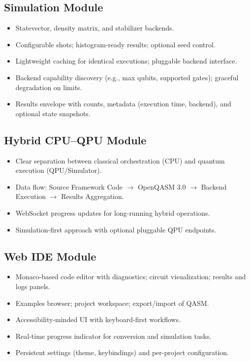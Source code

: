 \subsection{Simulation Module}
\begin{itemize}
    \item Statevector, density matrix, and stabilizer backends.
    \item Configurable shots; histogram-ready results; optional seed control.
    \item Lightweight caching for identical executions; pluggable backend interface.
    \item Backend capability discovery (e.g., max qubits, supported gates); graceful degradation on limits.
    \item Results envelope with counts, metadata (execution time, backend), and optional state snapshots.
\end{itemize}

\subsection{Hybrid CPU–QPU Module}
\begin{itemize}
    \item Clear separation between classical orchestration (CPU) and quantum execution (QPU/Simulator).
    \item Data flow: Source Framework Code $\rightarrow$ OpenQASM 3.0 $\rightarrow$ Backend Execution $\rightarrow$ Results Aggregation.
    \item WebSocket progress updates for long-running hybrid operations.
    \item Simulation-first approach with optional pluggable QPU endpoints.
\end{itemize}

\subsection{Web IDE Module}
\begin{itemize}
    \item Monaco-based code editor with diagnostics; circuit visualization; results and logs panels.
    \item Examples browser; project workspace; export/import of QASM.
    \item Accessibility-minded UI with keyboard-first workflows.
    \item Real-time progress indicator for conversion and simulation tasks.
    \item Persistent settings (theme, keybindings) and per-project configuration.
\end{itemize}

